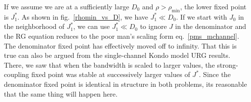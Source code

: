 If we assume we are at a sufficiently large \(D_0\) and \(\rho > \rho_\text{min}\), the lower fixed point is \(J_1^*\). As shown in fig.~\ref{rhomin_vs_D}, we have \(J_1^* \ll D_0\). If we start with \(J_0\) in the neighborhood of \(J_1^*\), we can use \(J_1^* \ll D_0\) to ignore \(J\) in the denominator and the RG equation reduces to the poor man's scaling form eq.~\ref{pms_mchannel}. The denominator fixed point has effectively moved off to infinity. That this is true can also be argued from the single-channel Kondo model URG results. There, we saw that when the bandwidth is scaled to larger values, the strong-coupling fixed point was stable at successively larger values of \(J^*\). Since the denominator fixed point is identical in structure in both problems, its reasonable that the same thing will happen here.
